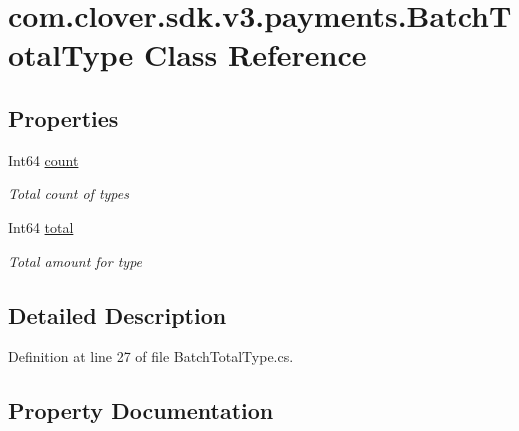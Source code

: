 \hypertarget{classcom_1_1clover_1_1sdk_1_1v3_1_1payments_1_1_batch_total_type}{}\section{com.\+clover.\+sdk.\+v3.\+payments.\+Batch\+Total\+Type Class Reference}
\label{classcom_1_1clover_1_1sdk_1_1v3_1_1payments_1_1_batch_total_type}
\subsection*{Properties}
\begin{DoxyCompactItemize}
\item 
Int64 \hyperlink{classcom_1_1clover_1_1sdk_1_1v3_1_1payments_1_1_batch_total_type_a0fdb3e90182ba6f3ef7638757ba2d367}{count}
\begin{DoxyCompactList}\small\item\em Total count of types \end{DoxyCompactList}\item 
Int64 \hyperlink{classcom_1_1clover_1_1sdk_1_1v3_1_1payments_1_1_batch_total_type_aa1fbbae3f87aa1c20b15cab3e1e03dd7}{total}
\begin{DoxyCompactList}\small\item\em Total amount for type \end{DoxyCompactList}\end{DoxyCompactItemize}


\subsection{Detailed Description}


Definition at line 27 of file Batch\+Total\+Type.\+cs.



\subsection{Property Documentation}
\mbox{\label{classcom_1_1clover_1_1sdk_1_1v3_1_1payments_1_1_batch_total_type_a0fdb3e90182ba6f3ef7638757ba2d367}} 
